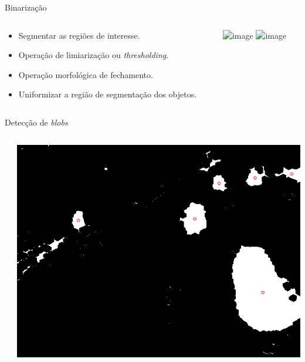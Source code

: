 \begin{frame}{Binarização}
  \begin{columns}[T]
    \begin{column}{.5\textwidth}
      \begin{itemize}
        \item<1-> Segmentar as regiões de interesse.
        \item<1-> Operação de limiarização ou \textit{thresholding}.
        \item<2-> Operação morfológica de fechamento.
        \item<2-> Uniformizar a região de segmentação dos objetos.
      \end{itemize}
    \end{column}
    \begin{column}{.5\textwidth}
      \begin{block}{}
        \includegraphics<1>[width=\textwidth]{imgs/bin.png}
        \includegraphics<2>[width=\textwidth]{imgs/morph.png}
      \end{block}
    \end{column}
  \end{columns}
\end{frame}

\begin{frame}{Detecção de \textit{blobs}}
  \begin{columns}[T]
    \begin{column}{.5\textwidth}
      
    \end{column}
    \begin{column}{.5\textwidth}
      \begin{block}{}
        \includegraphics[width=\textwidth]{imgs/keypoints.png}
      \end{block}
    \end{column}
  \end{columns}
\end{frame}

